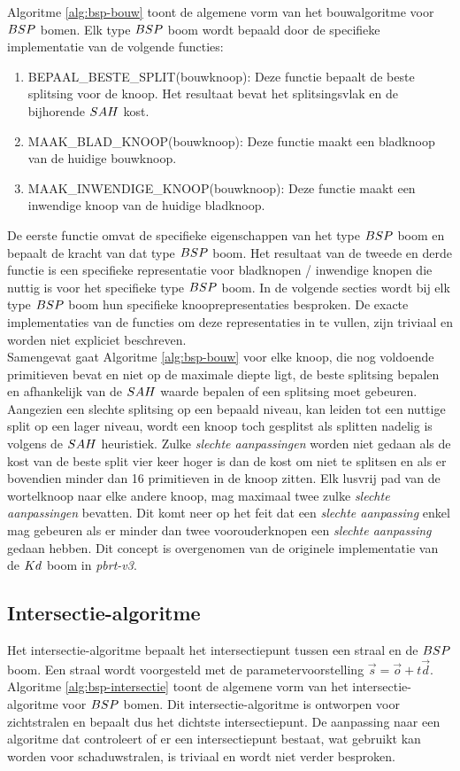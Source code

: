 Algoritme \ref{alg:bsp-bouw} toont de algemene vorm van het bouwalgoritme voor $BSP$ bomen.
Elk type $BSP$ boom wordt bepaald door de specifieke implementatie van de volgende functies:
\begin{enumerate}
    \item BEPAAL\_BESTE\_SPLIT(bouwknoop): Deze functie bepaalt de beste splitsing voor de knoop. Het resultaat bevat het splitsingsvlak en de bijhorende $SAH$ kost.
    \item MAAK\_BLAD\_KNOOP(bouwknoop): Deze functie maakt een bladknoop van de huidige bouwknoop.
    \item MAAK\_INWENDIGE\_KNOOP(bouwknoop): Deze functie maakt een inwendige knoop van de huidige bladknoop.
\end{enumerate}
De eerste functie omvat de specifieke eigenschappen van het type $BSP$ boom en bepaalt de kracht van dat type $BSP$ boom. 
Het resultaat van de tweede en derde functie is een specifieke representatie voor bladknopen / inwendige knopen die nuttig is voor het specifieke type $BSP$ boom.
In de volgende secties wordt bij elk type $BSP$ boom hun specifieke knooprepresentaties besproken.
De exacte implementaties van de functies om deze representaties in te vullen, zijn triviaal en worden niet expliciet beschreven.\\


Samengevat gaat Algoritme \ref{alg:bsp-bouw} voor elke knoop, die nog voldoende primitieven bevat en niet op de maximale diepte ligt, de beste splitsing bepalen en afhankelijk van de $SAH$ waarde bepalen of een splitsing moet gebeuren. 
Aangezien een slechte splitsing op een bepaald niveau, kan leiden tot een nuttige split op een lager niveau, wordt een knoop toch gesplitst als splitten nadelig is volgens de $SAH$ heuristiek.
Zulke \textit{slechte aanpassingen} worden niet gedaan als de kost van de beste split vier keer hoger is dan de kost om niet te splitsen en als er bovendien minder dan 16 primitieven in de knoop zitten.
Elk lusvrij pad van de wortelknoop naar elke andere knoop, mag maximaal twee zulke \textit{slechte aanpassingen} bevatten.
Dit komt neer op het feit dat een \textit{slechte aanpassing} enkel mag gebeuren als er minder dan twee voorouderknopen een \textit{slechte aanpassing} gedaan hebben.
Dit concept is overgenomen van de originele implementatie van de $Kd$ boom in \textit{pbrt-v3}.

\subsection{Intersectie-algoritme}
Het intersectie-algoritme bepaalt het intersectiepunt tussen een straal en de $BSP$ boom.
Een straal wordt voorgesteld met de parametervoorstelling $\vec{s} = \vec{o} + t\vec{d}$.
Algoritme \ref{alg:bsp-intersectie} toont de algemene vorm van het intersectie-algoritme voor $BSP$ bomen.
Dit intersectie-algoritme is ontworpen voor zichtstralen en bepaalt dus het dichtste intersectiepunt.
De aanpassing naar een algoritme dat controleert of er een intersectiepunt bestaat, wat gebruikt kan worden voor schaduwstralen, is triviaal en wordt niet verder besproken.\\

